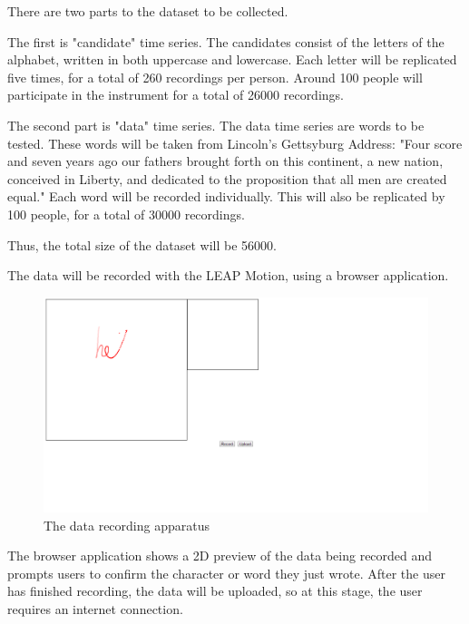 There are two parts to the dataset to be collected.

The first is "candidate" time series. The candidates consist of the letters of the alphabet, written in both uppercase and lowercase. Each letter will be replicated five times, for a total of 260 recordings per person. Around 100 people will participate in the instrument for a total of 26000 recordings.

The second part is "data" time series. The data time series are words to be tested. These words will be taken from Lincoln's Gettsyburg Address: "Four score and seven years ago our fathers brought forth on this continent, a new nation, conceived in Liberty, and dedicated to the proposition that all men are created equal." Each word will be recorded individually. This will also be replicated by 100 people, for a total of 30000 recordings.

Thus, the total size of the dataset will be 56000.

The data will be recorded with the LEAP Motion, using a browser application. \\
\begin{figure}
  \begin{center}
  \includegraphics[width=\columnwidth]{images/recording-1.PNG}
  \caption{The data recording apparatus}
  \label{fig:teaser}
  \end{center}  
\end{figure}
The browser application shows a 2D preview of the data being recorded and prompts users to confirm the character or word they just wrote.
After the user has finished recording, the data will be uploaded, so at this stage, the user requires an internet connection.

